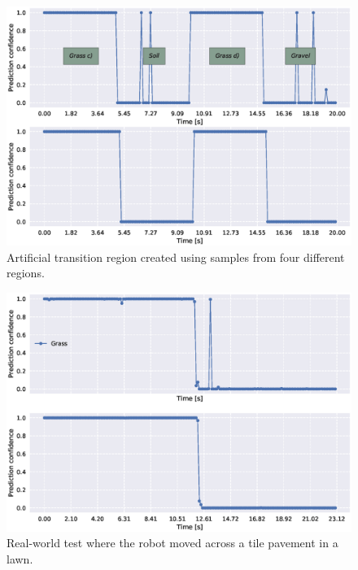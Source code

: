 \begin{figure}
	\centering
	\includegraphics[scale=0.5]{figs_temp/varmats2}
	\caption{Artificial transition region created using samples from four different regions.}
	\label{fig:artificial2}
\end{figure}

\begin{figure}
	\centering
	\includegraphics[scale=0.5]{figs_temp/transition_grass_tiles_grass}
	\caption{Real-world test where the robot moved across a tile pavement in a lawn.} 
	\label{fig:trans_tgtg}
\end{figure}

